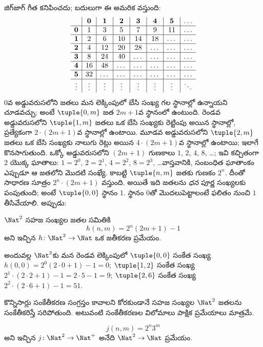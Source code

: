 \documentclass[../../../include/open-logic-section]{subfiles}
\begin{document}
\begin{explain}
జిగ్‌జాగ్ గీత కనిపించదు; బదులుగా ఈ అమరిక వస్తుంది:
\[
\begin{array}{ c | c | c | c | c | c | c | c }
& \mathbf 0 & \mathbf 1 & \mathbf 2 & \mathbf 3 & \mathbf 4 & \mathbf 5 & \dots \\
\hline
\mathbf 0 & 1 & 3 & 5 & 7 & 9 & 11 & \dots \\
\hline
\mathbf 1 & 2 & 6 & 10 & 14 & 18 & \dots & \dots \\
\hline
\mathbf 2 & 4 & 12 & 20 & 28 & \dots & \dots & \dots \\
\hline
\mathbf 3 & 8 & 24 & 40 & \dots & \dots & \dots & \dots \\
\hline
\mathbf 4 & 16 & 48 & \dots & \dots & \dots & \dots & \dots \\
\hline
\mathbf 5 & 32 & \dots & \dots & \dots & \dots & \dots & \dots \\
\hline
\vdots & \vdots & \vdots & \vdots & \vdots & \vdots & \vdots & \ddots\\
\end{array}
\]
$0$వ అడ్డువరుసలోని జతలు మన లెక్కింపులో బేసి సంఖ్య గల స్థానాల్లో
ఉన్నాయని చూడవచ్చు; అంటే $\tuple{0,m}$ జత $2m+1$వ స్థానంలో ఉంటుంది.
రెండవ అడ్డువరుసలోని $\tuple{1,m}$ జతలు ఒక బేసి సంఖ్యకు రెట్టింపు
అయిన స్థానాల్లో, ప్రత్యేకంగా $2 \cdot (2m+1)$వ స్థానాల్లో ఉంటాయి.
మూడవ అడ్డువరుసలోని $\tuple{2,m}$ జతలు ఒక బేసి సంఖ్యకు నాలుగు రెట్లు
అయిన $4 \cdot (2m+1)$వ స్థానాల్లో ఉంటాయి; ఇలాగే కొనసాగుతుంది.
ఒక్కో అడ్డువరుసలోని $(2m+1)$ గుణకాలు $1$, $2$, $4$, $8$, \dots;
ఇవి కచ్చితంగా $2$ యొక్క ఘాతాలు: $1= 2^0$, $2 = 2^1$,
$4 = 2^2$, $8 = 2^3$, \dots\@ వాస్తవానికి, సంబంధిత ఘాతాంకం ఎప్పుడూ
ఆ జతలోని మొదటి సంఖ్యే. కాబట్టి $\tuple{n,m}$ జతకు గుణకం $2^n$.
దీంతో సాధారణ సూత్రం $2^n \cdot (2m+1)$ వస్తుంది. అయితే ఇది జతలను
\emph{ధన} పూర్ణ సంఖ్యలకు పంపుతుంది; అంటే $\tuple{0,0}$ స్థానం $1$.
స్థానం $0$తో మొదలుపెట్టాలంటే ఫలితం నుంచి $1$ తీసివేయాలి. అప్పుడు:
\end{explain}

\begin{ex}
$\Nat^2$ సహజ సంఖ్యల జతల సమితికి
\[
h(n,m) = 2^n (2m+1) - 1
\]
అని ఇచ్చిన $h\colon \Nat^2 \to \Nat$ ఒక జతీకరణ ప్రమేయం.
\end{ex}

\begin{explain}
అందువల్ల $\Nat^2$కు మన రెండవ లెక్కింపులో $\tuple{0,0}$ సంకేత సంఖ్య
$h(0,0) = 2^0(2\cdot 0+1) - 1 = 0$; $\tuple{1,2}$ సంకేత సంఖ్య
$2^{1} \cdot (2 \cdot 2 + 1) - 1 = 2 \cdot 5 - 1 = 9$;
$\tuple{2,6}$ సంకేత సంఖ్య $2^{2} \cdot (2 \cdot 6 + 1) - 1 = 51$.
\end{explain}

కొన్నిసార్లు సంకేతీకరణ సంగ్రస్తం కావాలని కోరకుండానే సహజ సంఖ్యల
$\Nat^2$ జతలను సంకేతీకరిస్తే సరిపోతుంది. అటువంటి సంకేతీకరణల విలోమాలు
పాక్షిక ప్రమేయాలు మాత్రమే.

\begin{ex}
\[
j(n,m) = 2^n3^m
\]
అని ఇచ్చిన $j\colon \Nat^2 \to \Nat^+$ అనేది $\Nat^2 \to \Nat$
 ప్రమేయం.
\end{ex}
\end{document}
